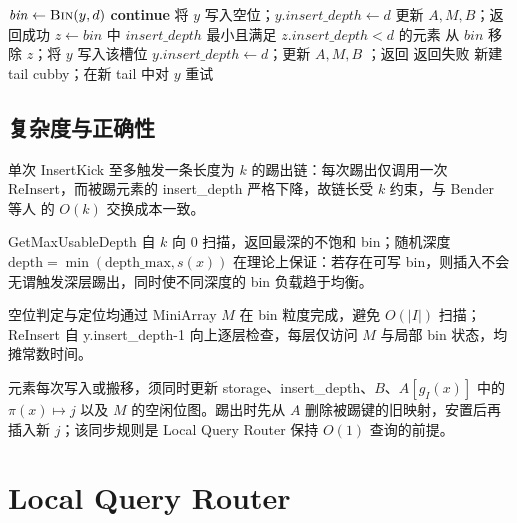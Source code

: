 \begin{algorithm}[htbp]
  \caption{ReInsert：被踢元素向上找空位}
  \label{alg:reinsert}
  \begin{algorithmic}[1]
        \State $\mathit{bin}\gets\Call{Bin}{y,d}$
          \State \textbf{continue}
        \EndIf
          \State 将 $y$ 写入空位；$y.insert\_depth\gets d$
          \State 更新 $A,M,B$；返回成功
          \State $z\gets\mathit{bin}$ 中 $insert\_depth$ 最小且满足 $z.insert\_depth<d$ 的元素
          \State 从 $\mathit{bin}$ 移除 $z$；将 $y$ 写入该槽位
          \State $y.insert\_depth\gets d$；更新 $A,M,B$
          \State {}；返回
        \EndIf
      \EndFor
      \State 返回失败 
      \State 新建 tail cubby；在新 tail 中对 $y$ 重试 
    \EndFunction
  \end{algorithmic}
\end{algorithm}

\subsection{复杂度与正确性}

单次 InsertKick 至多触发一条长度为 \(k\) 的踢出链：每次踢出仅调用一次 ReInsert，而被踢元素的 insert\_depth 严格下降，故链长受 \(k\) 约束，与 Bender 等人\cite{bender2022otsh} 的 \(O(k)\) 交换成本一致。

 GetMaxUsableDepth 自 \(k\) 向 0 扫描，返回最深的不饱和 bin；随机深度 \(\mathrm{depth}=\min(\mathrm{depth\_max},s(x))\) 在理论上保证：若存在可写 bin，则插入不会无谓触发深层踢出，同时使不同深度的 bin 负载趋于均衡\cite{mitzenmacher2001}。

空位判定与定位均通过 MiniArray \(M\) 在 bin 粒度完成，避免 \(O(|I|)\) 扫描；ReInsert 自 y.insert\_depth-1 向上逐层检查，每层仅访问 \(M\) 与局部 bin 状态，均摊常数时间。

元素每次写入或搬移，须同时更新 storage、insert\_depth、\(B\)、\(A[g_I(x)]\) 中的 \(\pi(x)\mapsto j\) 以及 \(M\) 的空闲位图。踢出时先从 \(A\) 删除被踢键的旧映射，安置后再插入新 \(j\)；该同步规则是 Local Query Router 保持 \(O(1)\) 查询的前提。

\section{Local Query Router}

